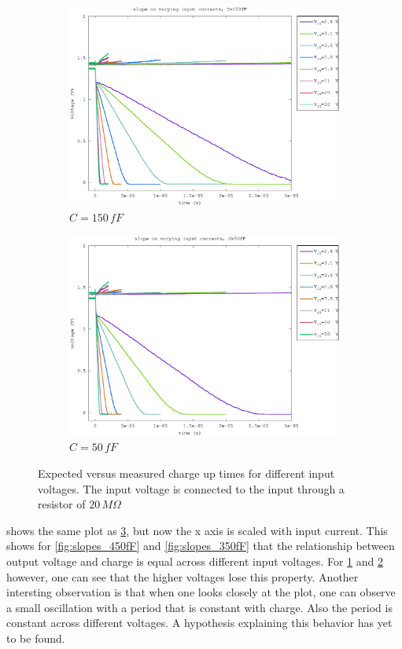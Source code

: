 \documentclass{article}
\begin{document}
\begin{figure}[h]
\begin{subfigure}[b]{0.475\textwidth}
	    \includegraphics[width=\textwidth]{fig/slope_150fF.eps}
	    \caption[]%
	    {$C=150\,fF$}    
	    \label{fig:slopes_150fF}
	\end{subfigure}
	\quad
	\begin{subfigure}[b]{0.475\textwidth}   
	    \centering 
	    \includegraphics[width=\textwidth]{fig/slope_50fF.eps}
	    \caption[]%
	    {$C=50\,fF$}    
	    \label{fig:slopes_50fF}
	\end{subfigure}
	\caption{Expected versus measured charge up times for different input voltages. The input voltage is connected to the input through a resistor of $20\,M\Omega$}
	\label{fig:slopes}
\end{figure}

 shows the same plot as \cref{fig:slopes}, but now the x axis is scaled with input current. This shows for \cref{fig:slopes_450fF} and \ref{fig:slopes_350fF} that the relationship between output voltage and charge is equal across different input voltages. For \cref{fig:slopes_150fF} and \ref{fig:slopes_50fF} however, one can see that the higher voltages lose this property. Another intersting observation is that when one looks closely at the plot, one can observe a small oscillation with a period that is constant with charge. Also the period is constant across different voltages. A hypothesis explaining this behavior has yet to be found.
\end{document}
